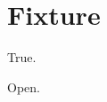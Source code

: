 \section{Fixture}

\begin{theorem}[Fixture]\label{thm:fixture}\notready
True.
\end{theorem}

\begin{theorem}\label{thm:fixture-frontier}\notready{}
Open.
\end{theorem}
